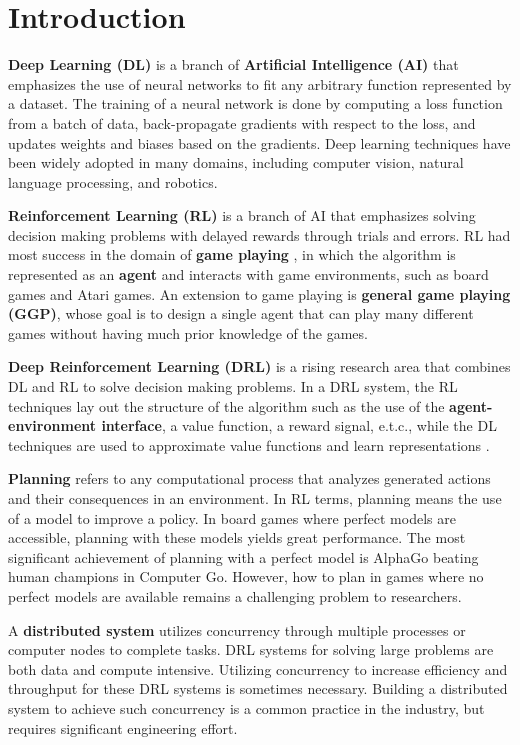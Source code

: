 \chapter{Introduction} \label{sec:intro}

\textbf{Deep Learning (DL)} is a branch of \textbf{Artificial Intelligence (AI)} that emphasizes the use of neural networks to fit any arbitrary function represented by a dataset.
The training of a neural network is done by computing a loss function from a batch of data, back-propagate gradients with respect to the loss, and updates weights and biases based on the gradients.
Deep learning techniques have been widely adopted in many domains, including computer vision, natural language processing, and robotics.

\textbf{Reinforcement Learning (RL)} is a branch of AI that emphasizes solving decision making problems with delayed rewards through trials and errors.
RL had most success in the domain of \textbf{game playing} \cite{MasteringGameGo_Silver.Schrittwieser.ea_2017}, in which the algorithm is represented as an \textbf{agent} and interacts with game environments, such as board games and Atari games.
An extension to game playing is \textbf{general game playing (GGP)}, whose goal is to design a single agent that can play many different games without having much prior knowledge of the games.

\textbf{Deep Reinforcement Learning (DRL)} is a rising research area that combines DL and RL to solve decision making problems.
In a DRL system, the RL techniques lay out the structure of the algorithm such as the use of the \textbf{agent-environment interface}, a value function, a reward signal, e.t.c., while the DL techniques are used to approximate value functions and learn representations \cite{ReinforcementLearningIntroduction_Sutton.Barto_2018}.

\textbf{Planning} refers to any computational process that analyzes generated actions and their consequences in an environment.
In RL terms, planning means the use of a model to improve a policy.
In board games where perfect models are accessible, planning with these models yields great performance.
The most significant achievement of planning with a perfect model is AlphaGo beating human champions in Computer Go.
However, how to plan in games where no perfect models are available remains a challenging problem to researchers.

A \textbf{distributed system} utilizes concurrency through multiple processes or computer nodes to complete tasks.
DRL systems for solving large problems are both data and compute intensive.
Utilizing concurrency to increase efficiency and throughput for these DRL systems is sometimes necessary.
    Building a distributed system to achieve such concurrency is a common practice in the industry, but requires significant engineering effort.

